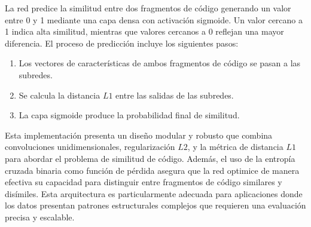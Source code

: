 La red predice la similitud entre dos fragmentos de código generando un valor entre 0 y 1 mediante una capa densa con activación sigmoide. Un valor cercano a 1 indica alta similitud, mientras que valores cercanos a 0 reflejan una mayor diferencia. El proceso de predicción incluye los siguientes pasos:
\begin{enumerate}
    \item Los vectores de características de ambos fragmentos de código se pasan a las subredes.
    \item Se calcula la distancia \( L1 \) entre las salidas de las subredes.
    \item La capa sigmoide produce la probabilidad final de similitud.
\end{enumerate}



Esta implementación presenta un diseño modular y robusto que combina convoluciones unidimensionales, regularización \( L2 \), y la métrica de distancia \( L1 \) para abordar el problema de similitud de código. Además, el uso de la entropía cruzada binaria como función de pérdida asegura que la red optimice de manera efectiva su capacidad para distinguir entre fragmentos de código similares y disímiles. Esta arquitectura es particularmente adecuada para aplicaciones donde los datos presentan patrones estructurales complejos que requieren una evaluación precisa y escalable. 
